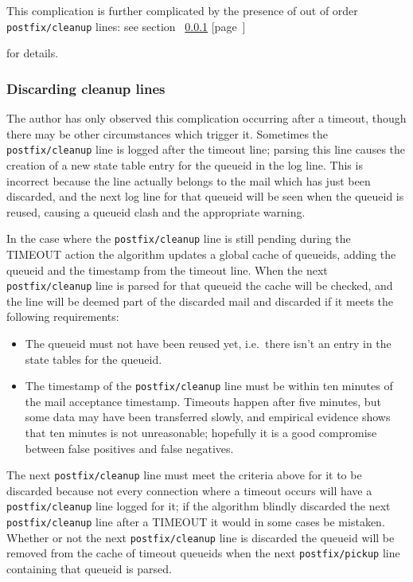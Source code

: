\documentclass[a4paper,12pt,draft]{article}
\newcommand{\refwithpage}[1]{%
    \empty{}\ref{#1} [page~\pageref{#1}]%
}
\newcommand{\daemon}[1]{%
    \texttt{postfix/#1}%
}
\begin{document}
This complication is further complicated by the presence of out of order
\daemon{cleanup} lines: see section~\refwithpage{discarding cleanup lines}
for details.

\subsubsection{Discarding cleanup lines}

\label{discarding cleanup lines}

The author has only observed this complication occurring after a timeout,
though there may be other circumstances which trigger it.  Sometimes the
\daemon{cleanup} line is logged after the timeout line; parsing this line
causes the creation of a new state table entry for the queueid in the log
line.  This is incorrect because the line actually belongs to the mail
which has just been discarded, and the next log line for that queueid will
be seen when the queueid is reused, causing a queueid clash and the
appropriate warning.

In the case where the \daemon{cleanup} line is still pending during the
TIMEOUT action the algorithm updates a global cache of queueids, adding the
queueid and the timestamp from the timeout line.  When the next
\daemon{cleanup} line is parsed for that queueid the cache will be checked,
and the line will be deemed part of the discarded mail and discarded if it
meets the following requirements:

\begin{itemize}

    \item The queueid must not have been reused yet, i.e.\ there isn't an
        entry in the state tables for the queueid.

    \item The timestamp of the \daemon{cleanup} line must be within ten
        minutes of the mail acceptance timestamp.  Timeouts happen after
        five minutes, but some data may have been transferred slowly, and
        empirical evidence shows that ten minutes is not unreasonable;
        hopefully it is a good compromise between false positives and false
        negatives.

\end{itemize}

The next \daemon{cleanup} line must meet the criteria above for it to be
discarded because not every connection where a timeout occurs will have a
\daemon{cleanup} line logged for it; if the algorithm blindly discarded the
next \daemon{cleanup} line after a TIMEOUT it would in some cases be
mistaken.  Whether or not the next \daemon{cleanup} line is discarded the
queueid will be removed from the cache of timeout queueids when the next
\daemon{pickup} line containing that queueid is parsed.
\end{document}
